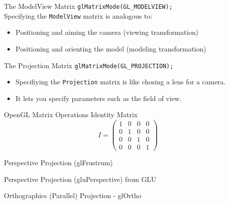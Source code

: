 \documentclass[xcolor=dvipsnames,t]{beamer}
\newcommand{\showcode}[1]{\begin{mdframed}[style=code] %
                          \end{mdframed}%
}
\begin{document}
\begin{frame}{The ModelView Matrix}
    \texttt{glMatrixMode(GL\_MODELVIEW);} \\[1cm]
    Specifying the \texttt{ModelView} matrix is analogous to:
    \begin{itemize} 
        \item Positioning and aiming the camera (viewing transformation)
        \item Positioning and orienting the model (modeling transformation)
    \end{itemize} 
\end{frame} 

\begin{frame}{The Projection Matrix}
\texttt{glMatrixMode(GL\_PROJECTION);} \\[1cm]
    \begin{itemize} 
        \item Specifiying the \texttt{Projection} matrix is like chosing a lens for a camera.
        \item It lets you specify parameters such as the field of view.
    \end{itemize} 
\end{frame} 

\begin{frame}{OpenGL Matrix Operations} 
    Identity Matrix
    \begin{equation*}
    I = \left(
                \begin{array}{cccc}
                    1   & 0     & 0     & 0     \\
                    0   & 1     & 0     & 0     \\
                    0   & 0     & 1     & 0     \\
                    0   & 0     & 0     & 1
                \end{array} 
            \right)
    \end{equation*} 
    \showcode{matrixops.c} 
\end{frame} 

\begin{frame}{Perspective Projection (glFrustrum)}
\end{frame} 

\begin{frame}{Perspective Projection (gluPerspective) from GLU} 
\end{frame} 

\begin{frame}{Orthographics (Parallel) Projection - glOrtho} 
\end{frame} 
\end{document}
